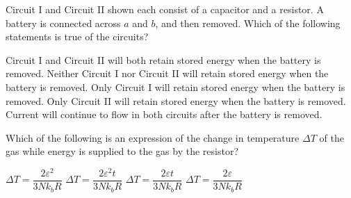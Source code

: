 \documentclass{../../oss-apphys-exam}
\begin{document}
\begin{questions}
  \question Circuit I and Circuit II shown each consist of a capacitor and a
  resistor. A battery is connected across $a$ and $b$, and then removed. Which
  of the following statements is true of the circuits?
  \begin{center}
    \hspace{.5in}
  \end{center}
  \begin{choices}
    \choice Circuit I and Circuit II will both retain stored energy when the
    battery is removed.
    \choice Neither Circuit I nor Circuit II will retain stored energy when
    the battery is removed.
    \choice Only Circuit I will retain stored energy when the battery is
    removed.
    \choice Only Circuit II will retain stored energy when the battery is
    removed.
    \choice Current will continue to flow in both circuits after the battery
    is removed.
  \end{choices}
  

  \question Which of the following is an expression of the change in temperature
  $\Delta T$ of the gas while energy is supplied to the gas by the resistor?
  \label{temp1}
  \begin{choices}
    \choice $\Delta T=\dfrac{2\varepsilon^2}{3Nk_bR}$
    \choice $\Delta T=\dfrac{2\varepsilon^2t}{3Nk_bR}$
    \choice $\Delta T=\dfrac{2\varepsilon t}{3Nk_bR}$
    \choice $\Delta T=\dfrac{2\varepsilon}{3Nk_bR}$
  \end{choices}
  \newpage
  

\end{questions}
\end{document}
